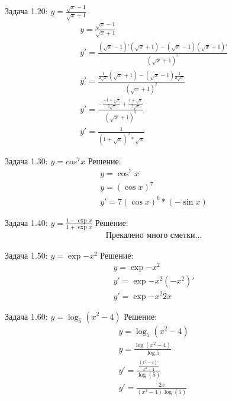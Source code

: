 \documentclass[a4paper, 20pt, fleqn, border=2pt]{article}
\begin{document}
\begin{enumerate}
Задача 1.20: $y = \frac{\sqrt{x} - 1}{\sqrt{x} + 1}$
\begin{equation}
\begin{split}
    y = \frac{\sqrt{x} - 1}{\sqrt{x} + 1} \\
    y' = \frac{
        (\sqrt{x} - 1)'(\sqrt{x} + 1) - 
        (\sqrt{x} - 1)(\sqrt{x} + 1)'
    }
    {
        (\sqrt{x} + 1)^2
    } \\
    y' = \frac{ 
        \frac{1}{2\sqrt{x}}(\sqrt{x} + 1) - 
        (\sqrt{x} - 1)\frac{1}{2\sqrt{x}}
    }
    {
        (\sqrt{x} + 1) ^ 2
    } \\
    y' = \frac{
        -\frac{-1 + \sqrt{x}}{2\sqrt{x}} +
        \frac{1 + \sqrt{x}}{2\sqrt{x}}
    }
    {
        (\sqrt{x} + 1) ^ 2
    } \\
    y' = \frac{1}{(1 + \sqrt{x})^2*\sqrt{x}}
\end{split}
\end{equation}

Задача 1.30: $y = cos^7{x}$
Решение:
\begin{equation}
\begin{split}
    y = \cos^7{x} \\
    y = (\cos{x})^7 \\
    y'= 7(\cos{x})^6*(-\sin{x})
\end{split}
\end{equation}

Задача 1.40: $y = \frac{1 - \exp{x}}{1 + \exp{x}}$
Решение:
\begin{equation}
\begin{split}
    \text{Прекалено много сметки...}
\end{split}
\end{equation}

Задача 1.50: $y = \exp{-x^2}$
Решение:
\begin{equation}
\begin{split}
    y = \exp{-x^2} \\
    y' = \exp{-x^2}(-x^2)' \\
    y' = \exp{-x^2}2x
\end{split}
\end{equation}

Задача 1.60: $y = \log_5(x^2 - 4)$
Решение:
\begin{equation}
\begin{split}
    y = \log_5(x^2 - 4) \\
    y = \frac{\log(x^2 - 4)}{\log{5}} \\
    y' = \frac{\frac{(x^2 - 4)'}{x^2 - 4}}{\log(5)} \\
    y' = \frac{2x}{(x^2 - 4)\log(5)}
\end{split}
\end{equation}


\end{enumerate}
\end{document}
